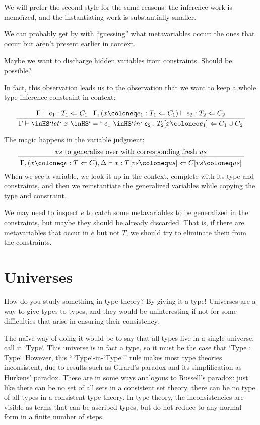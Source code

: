 \documentclass[11pt, twoside, reqno]{book}
\begin{document}
We will prefer the second style for the same reasons: the inference work is memo\"ized, and the instantiating work is substantially smaller.

We can probably get by with ``guessing'' what metavariables occur: the ones that occur but aren't present earlier in context.

Maybe we want to discharge hidden variables from constraints.
Should be possible?

In fact, this observation leads us to the observation that we want to keep a whole type inference constraint in context:

\begin{displaymath}
\prftree{\Gamma \vdash e_1 : T_1 \Leftarrow C_1}{\Gamma, (x \coloneq e_1 : T_1 \Leftarrow C_1) \vdash e_2 : T_2 \Leftarrow C_2}{\Gamma \vdash \inHS`let`\ x\ \inHS`=`\ e_1\ \inHS`in`\ e_2 : T_2[x \coloneq e_1] \Leftarrow C_1 \cup C_2}
\end{displaymath}

The magic happens in the variable judgment:
\begin{displaymath}
\prftree{vs\text{\ to generalize over with corresponding fresh\ } us}{\Gamma, (x \coloneq e : T \Leftarrow C), \Delta \vdash x : T[vs \coloneq us] \Leftarrow C[vs \coloneq us]}
\end{displaymath}
When we see a variable, we look it up in the context, complete with its type and constraints, and then we reinstantiate the generalized variables while copying the type and constraint.

\begin{mdframed}[style=Note]
We may need to inspect \(e\) to catch some metavariables to be generalized in the constraints, but maybe they should be already discarded.
That is, if there are metavariables that occur in \(e\) but not \(T\), we should try to eliminate them from the constraints.
\end{mdframed}

\chapter{Universes}
\label{universes}

How do you study something in type theory?
By giving it a type!
Universes are a way to give types to types, and they would be uninteresting if not for some difficulties that arise in ensuring their consistency.

The na\"ive way of doing it would be to say that all types live in a single universe, call it \inHS`Type`.
This universe is in fact a type, so it must be the case that \inHS`Type : Type`.
However, this ``\inHS`Type`-in-\inHS`Type`'' rule makes most type theories inconsistent, due to results such as Girard's paradox and its simplification as Hurkens' paradox.
These are in some ways analogous to Russell's paradox: just like there can be no set of all sets in a consistent set theory, there can be no type of all types in a consistent type theory.
In type theory, the inconsistencies are visible as terms that can be ascribed types, but do not reduce to any normal form in a finite number of steps.
\end{document}
